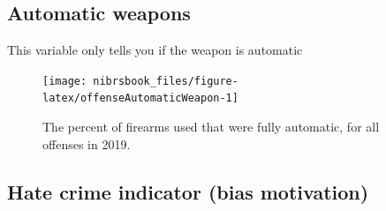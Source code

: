 \documentclass[
  12pt,
  openany]{book}
\begin{document}
\hypertarget{automatic-weapons}{%
\subsection{Automatic weapons}\label{automatic-weapons}}

This variable only tells you if the weapon is automatic

\begin{figure}

{\centering \texttt{[image: nibrsbook\_files/figure-latex/offenseAutomaticWeapon-1]} 

}

\caption{The percent of firearms used that were fully automatic, for all offenses in 2019.}\label{fig:offenseAutomaticWeapon}
\end{figure}

\hypertarget{hate-crime-indicator-bias-motivation}{%
\subsection{Hate crime indicator (bias motivation)}\label{hate-crime-indicator-bias-motivation}}
\end{document}
